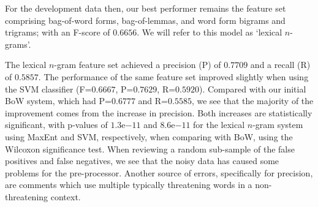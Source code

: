\documentclass[11pt,letterpaper]{article}
\begin{document}
For the development data then, our best performer remains the feature set comprising bag-of-word forms, bag-of-lemmas, and word form bigrams and trigrams; with an F-score of $0.6656$. We will refer to this model as `lexical $n$-grams'. %







The lexical $n$-gram feature set achieved a precision (P) of $0.7709$ and a recall (R) of $0.5857$. The performance of the same feature set improved slightly when using the SVM classifier (F=$0.6667$, P=$0.7629$, R=$0.5920$).
Compared with our initial BoW system, which had P=$0.6777$ and R=$0.5585$, we see that the majority of the improvement comes from the increase in precision. Both increases are statistically significant, with p-values of $1.3\mathrm{e}{-11}$ and $8.6\mathrm{e}{-11}$ for the lexical $n$-gram system using MaxEnt and SVM, respectively, when comparing with BoW, using the Wilcoxon significance test. When reviewing a random sub-sample of the false positives and false negatives, we see that the noisy data has caused some problems for the pre-processor. %
Another source of errors, specifically for precision, are comments which use multiple typically threatening words in a non-threatening context.


      
\end{document}
